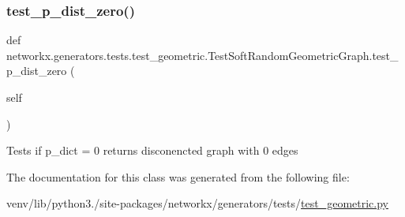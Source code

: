 \subsubsection{\texorpdfstring{test\+\_\+p\+\_\+dist\+\_\+zero()}{test\_p\_dist\_zero()}}
{\footnotesize\ttfamily def networkx.\+generators.\+tests.\+test\+\_\+geometric.\+Test\+Soft\+Random\+Geometric\+Graph.\+test\+\_\+p\+\_\+dist\+\_\+zero (\begin{DoxyParamCaption}\item[{}]{self }\end{DoxyParamCaption})}

\begin{DoxyVerb}Tests if p_dict = 0 returns disconencted graph with 0 edges\end{DoxyVerb}
 

The documentation for this class was generated from the following file\+:\begin{DoxyCompactItemize}
\item 
venv/lib/python3./site-\/packages/networkx/generators/tests/\hyperlink{test__geometric_8py}{test\+\_\+geometric.\+py}\end{DoxyCompactItemize}
